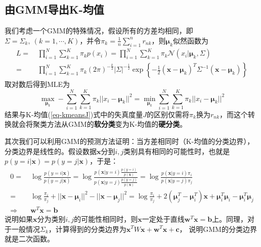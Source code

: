 \documentclass[12pt, a4paper, oneside]{ctexart}
\def\bd{\boldsymbol}        %
\begin{document}
\subsection{由GMM导出K-均值}
我们考虑一个GMM的特殊情况，假设所有的方差均相同，即$\Sigma = \Sigma_k,\ (k=1,\cdots,K)$，并令$\pi_k = \frac{1}{n}\sum_{i=1}^nr_{nk}$，则$\bd{\mu}_k$似然函数为
\begin{align*}
    L =&\ \prod_{i=1}^{N}\sum_{k=1}^K\pi_kp(x_i) = \prod_{i=1}^{N}\sum_{k=1}^K\pi_k\mathcal{N}(x_i|\bd{\mu}_k,\Sigma)\\
    =&\ \prod_{i=1}^{N}\sum_{k=1}^K\pi_k(2\pi)^{-\frac{k}{2}}|\Sigma|^{-\frac{1}{2}}\exp\left\{-\frac{1}{2}(\bd{x}-\bd{\mu}_k)^T\Sigma^{-1}(\bd{x}-\bd{\mu}_k)\right\}
\end{align*}
取对数后得到MLE为
\begin{equation*}
    \max_{\bd{\mu}_k}-\sum_{i=1}^{N}\sum_{k=1}^K\pi_{k}||x_i-\bd{\mu}_k||^2 = \min_{\bd{\mu}_k}\sum_{i=1}^{N}\sum_{k=1}^K\pi_{k}||x_i-\bd{\mu}_k||^2
\end{equation*}
结果与K-均值(\ref{eq-kmeansJ})式中的失真度量$J$的区别仅需将$\pi_k$换为$r_{nk}$，而这个转换就会将聚类方法从GMM的\textbf{软分类}变为K-均值的\textbf{硬分类}。

其次我们可以利用GMM的预测方法证明：当方差相同时（K-均值的分类边界），分类边界是线性的。假设数据$\bd{x}$分到$i,j$类别具有相同的可能性时，也就是$p(y=i|\bd{x})=p(y=j|\bd{x})$，于是：
\begin{align*}
    0=&\ \log\frac{p(y=i|\bd{x})}{p(y=j|\bd{x})} = \log\frac{p(\bd{x}|y=i)\frac{p(y=i)}{p(\bd{x})}}{p(\bd{x}|y=j)\frac{p(y=j)}{p(\bd{x})}} = \log\frac{p(\bd{x}|y=i)\pi_i}{p(\bd{x}|y=j)\pi_j}\\
    =&\ \log\frac{\pi_i}{\pi_j} + ||\bd{x}-\bd{\mu}_i||^2 - ||\bd{x}-\bd{\mu}_j||^2 = \log\frac{\pi_i}{\pi_j} + 2(\bd{\mu}_j^T-\bd{\mu}_i^T)\bd{x}+\bd{\mu}_i^T\bd{\mu}_i - \bd{\mu}_i^T\bd{\mu}_j\\
    \Rightarrow&\  \bd{w}^T\bd{x} = \bd{b}
\end{align*}
说明如果$\bd{x}$分为类别$i,j$的可能性相同时，则$\bd{x}$一定处于直线$\bd{w}^T\bd{x}=\bd{b}$上。同理，对于一般情况$\Sigma_k$，计算得到的分类边界为$\bd{x}^TW\bd{x}+\bd{w}^T\bd{x}+\bd{c}$，
说明GMM的分类边界就是二次函数。
\end{document}

